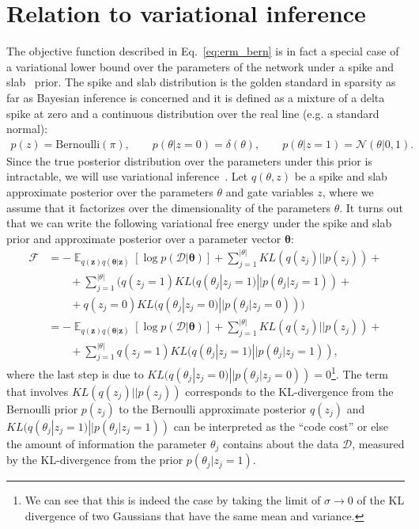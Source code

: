 \documentclass{article} %
\DeclareMathOperator{\E}{\mathbb{E}}
\def\!#1{\boldsymbol{#1}}
\def\*#1{\mathbf{#1}}
\begin{document}
\section{Relation to variational inference}\label{app:relation_vi}
The objective function described in Eq.~\ref{eq:erm_bern} is in fact a special case of a variational lower bound over the parameters of the network under a spike and slab~\citep{mitchell1988bayesian} prior. The spike and slab distribution is the golden standard in sparsity as far as Bayesian inference is concerned and it is defined as a mixture of a delta spike at zero and a continuous distribution over the real line (e.g. a standard normal):
\begin{align}
	p(z) = \text{Bernoulli}(\pi), \qquad p(\theta|z=0) = \delta(\theta), \qquad p(\theta|z=1) = \mathcal{N}(\theta| 0, 1).
\end{align}
Since the true posterior distribution over the parameters under this prior is intractable, we will use variational inference~\citep{beal2003variational}. Let $q(\theta, z)$ be a spike and slab approximate posterior over the parameters  $\theta$ and gate variables $z$, where we assume that it factorizes over the dimensionality of the parameters $\theta$. It turns out that we can write the following variational free energy under the spike and slab prior and approximate posterior over a parameter vector $\!\theta$:
\begin{align}
	\mathcal{F} & = - \E_{q(\*z)q(\!\theta|\*z)}[\log p(\mathcal{D}|\!\theta)] + \sum_{j=1}^{|\theta|}KL(q(z_j) || p(z_j)) + \nonumber \\&\qquad + \sum_{j=1}^{|\theta|}\big(q(z_j = 1) KL(q(\theta_j|z_j = 1) || p(\theta_j|z_j = 1)) + \nonumber \\&\qquad + q(z_j = 0)KL(q(\theta_j|z_j = 0) || p(\theta_j|z_j = 0))\big) \\
	& = - \E_{q(\*z)q(\!\theta|\*z)}[\log p(\mathcal{D}|\!\theta)] + \sum_{j=1}^{|\theta|}KL(q(z_j) || p(z_j)) + \nonumber \\&\qquad + \sum_{j=1}^{|\theta|}q(z_j = 1) KL(q(\theta_j|z_j = 1) || p(\theta_j|z_j = 1)),
\end{align}
where the last step is due to $KL(q(\theta_j|z_j = 0) || p(\theta_j|z_j = 0)) = 0$\footnote{We can see that this is indeed the case by taking the limit of $\sigma \rightarrow 0$ of the KL divergence of two Gaussians that have the same mean and variance.}. The term that involves $KL(q(z_j) || p(z_j))$ corresponds to the KL-divergence from the Bernoulli prior $p(z_j)$ to the Bernoulli approximate posterior $q(z_j)$ and $KL(q(\theta_j|z_j = 1) || p(\theta_j|z_j = 1))$ can be interpreted as the ``code cost'' or else the amount of information the parameter $\theta_j$ contains about the data $\mathcal{D}$, measured by the KL-divergence from the prior $p(\theta_j|z_j = 1)$. 
\end{document}
